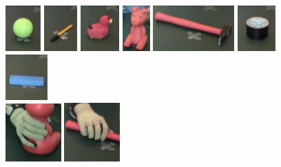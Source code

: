 \documentclass{article}
\begin{document}
\begin{figure}[!ht]
	\centering
	\includegraphics[height=1.75cm]{images/palla}
	\includegraphics[height=1.75cm]{images/penna}
	\includegraphics[height=1.75cm]{images/papera}
	\includegraphics[height=1.75cm]{images/porcellino}
	\includegraphics[height=1.75cm]{images/martello}
	\includegraphics[height=1.75cm]{images/scotch}
	\includegraphics[height=1.75cm]{images/lego}\\
	\vskip 0.1cm
	\includegraphics[width=0.19\textwidth]{images/cylinder}
	\includegraphics[width=0.19\textwidth]{images/flat}

\end{figure}
\end{document}
